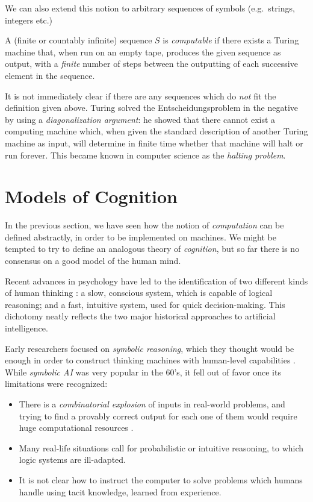 We can also extend this notion to arbitrary sequences of symbols (e.g.\ strings, integers etc.)

\begin{definition}
A (finite or countably infinite) sequence \(S\) is \emph{computable} if there exists a Turing machine that, when run on an empty tape, produces the given sequence as output, with a \emph{finite} number of steps between the outputting of each successive element in the sequence.
\end{definition}

It is not immediately clear if there are any sequences which do \emph{not} fit the definition given above. Turing solved the Entscheidungsproblem in the negative by using a \emph{diagonalization argument}: he showed that there cannot exist a computing machine which, when given the standard description of another Turing machine as input, will determine in finite time whether that machine will halt or run forever. This became known in computer science as the \emph{halting problem}.


\section{Models of Cognition}

In the previous section, we have seen how the notion of \emph{computation} can be defined abstractly, in order to be implemented on machines. We might be tempted to try to define an analogous theory of \emph{cognition}, but so far there is no consensus on a good model of the human mind.

Recent advances in psychology have led to the identification of two different kinds of human thinking \cite{Kahneman2011}: a slow, conscious system, which is capable of logical reasoning; and a fast, intuitive system, used for quick decision-making. This dichotomy neatly reflects the two major historical approaches to artificial intelligence.

Early researchers focused on \emph{symbolic reasoning}, which they thought would be enough in order to construct thinking machines with human-level capabilities \cite{NewelSimon1961}. While \emph{symbolic AI} was very popular in the 60's, it fell out of favor once its limitations were recognized:
\begin{itemize}
    \item There is a \emph{combinatorial explosion} of inputs in real-world problems, and trying to find a provably correct output for each one of them would require huge computational resources \cite{Lighthill1973}.
    \item Many real-life situations call for probabilistic or intuitive reasoning, to which logic systems are ill-adapted.
    \item It is not clear how to instruct the computer to solve problems which humans handle using tacit knowledge, learned from experience.
\end{itemize}

